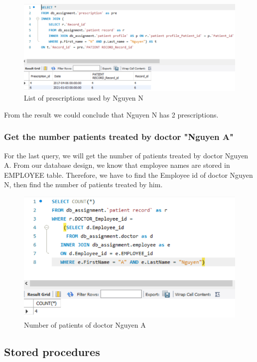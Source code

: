 \begin{figure}[H]
  \centering
  \includegraphics[width = 12cm]{assets/query_2.png}
  \captionsetup{justification=centering,margin=2cm}
  \caption{List of prescriptions used by Nguyen N}
\end{figure}

From the result we could conclude that Nguyen N has 2 prescriptions.

\subsubsection{Get the number patients treated by doctor "Nguyen A"}

For the last query, we will get the number of patients treated by doctor Nguyen A. From our database design, we know that employee names are stored in EMPLOYEE table. Therefore, we have to find the Employee id of doctor Nguyen N, then find the number of patients treated by him.

\begin{figure}[H]
  \centering
  \includegraphics[width = 12cm]{assets/query_3a.png}
  \captionsetup{justification=centering,margin=2cm}
  \caption{Number of patients of doctor Nguyen A}
\end{figure}

\subsection{Stored procedures}

